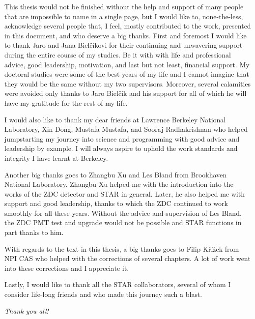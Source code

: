 \null \vfill {}
\bigskip

\noindent 
This thesis would not be finished without the help and support of many people that are impossible to name in a single page, but I would like to, none-the-less, acknowledge several people that, I feel, mostly contributed to the work, presented in this document, and who deserve a big thanks. First and foremost I would like to thank Jaro and Jana Bielčíkovi for their continuing and unwavering support during the entire course of my studies. Be it with with life and professional advice, good leadership, motivation, and last but not least, financial support. My doctoral studies were some of the best years of my life and I cannot imagine that they would be the same without my two supervisors. Moreover, several calamities were avoided only thanks to Jaro Bielčík and his support for all of which he will have my gratitude for the rest of my life.

I would also like to thank my dear friends at Lawrence Berkeley National Laboratory, Xin Dong, Mustafa Mustafa, and Sooraj Radhakrishnan who helped jumpstarting my journey into science and programming with good advice and leadership by example. I will always aspire to uphold the work standards and integrity I have learnt at Berkeley.

Another big thanks goes to Zhangbu Xu and Les Bland from Brookhaven National Laboratory. Zhangbu Xu  helped me with the introduction into the works of the ZDC detector and STAR in general. Later, he also helped  me with support and good leadership, thanks to which the ZDC continued to work smoothly for all these years. Without the advice and supervision of Les Bland, the ZDC PMT test  and upgrade would not be possible and STAR functions in part thanks to him.

With regards to the text in this thesis, a big thanks goes to Filip Křížek from NPI CAS who helped with the corrections of several chapters. A lot of work went into these corrections and I appreciate it.

Lastly, I would like to thank all the STAR collaborators, several of whom I consider life-long friends and who made this journey such a blast.

\noindent\emph{Thank you all!}


\newpage \cleardoublepage
